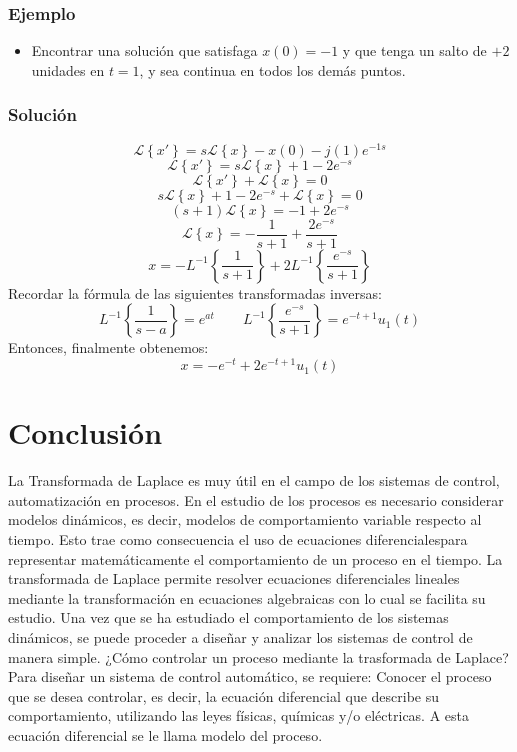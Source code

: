 \documentclass[12pt,a4paper,twoside,onecolumn,openany]{book}
\begin{document}
\subsection{Ejemplo}
\begin{itemize}
\item Encontrar una solución que satisfaga $x(0)=-1$ y que tenga un salto de $+2$ unidades en $t=1$, y sea continua en todos los demás puntos.
\end{itemize}
\subsection{Solución}
\[
\mathcal { L } \left\lbrace {{x'}}\right\rbrace= s \mathcal { L } \left\lbrace {{x}}\right\rbrace-x(0)-j(1)e^{-1s}
\]
\[
\mathcal { L } \left\lbrace {{x'}}\right\rbrace= s \mathcal { L } \left\lbrace {{x}}\right\rbrace+1-2e^{-s}
\]
\[
\mathcal { L } \left\lbrace {{x'}}\right\rbrace + \mathcal { L } \left\lbrace {{x}}\right\rbrace = 0
\]
\[
s\mathcal { L } \left\lbrace {{x}}\right\rbrace + 1 - 2e^{-s} +\mathcal { L } \left\lbrace {{x}}\right\rbrace = 0
\]
\[
(s+1)\mathcal { L } \left\lbrace {{x}}\right\rbrace=-1+2e^{-s}
\]
\[
\mathcal { L } \left\lbrace {{x}}\right\rbrace= -\frac{1}{s+1} + \frac{2e^{-s}}{s+1}
\]
\[
x= -L ^{-1} \left\lbrace {{\frac{1}{s+1}}}\right\rbrace + 2 L ^{-1} \left\lbrace {{\frac{e^{-s}}{s+1}}}\right\rbrace
\]
Recordar la fórmula de las siguientes transformadas inversas:
\[
L^{-1}  \left\lbrace {{\frac{1}{s-a}}}\right\rbrace= e^{at}  \qquad L ^{-1} \left\lbrace {{\frac{e^{-s}}{s+1}}}\right\rbrace= e^{-t+1} u_{1}(t)
\] 
Entonces, finalmente obtenemos:
\[
x=-e^{-t}+2e^{-t+1}u_{1}(t)
\]
\chapter{Conclusión}
La Transformada de Laplace es muy útil en el campo de los sistemas de control, automatización en procesos. En el estudio de los procesos es necesario considerar modelos dinámicos, es decir, modelos de comportamiento variable respecto al tiempo. Esto trae como consecuencia el uso de ecuaciones diferencialespara representar matemáticamente el comportamiento de un proceso en el tiempo.
La transformada de Laplace permite resolver ecuaciones diferenciales lineales mediante la transformación en ecuaciones algebraicas con lo cual se facilita su estudio.
Una vez que se ha estudiado el comportamiento de los sistemas dinámicos, se puede proceder a diseñar y analizar los sistemas de control de manera simple.
¿Cómo controlar un proceso mediante la trasformada de Laplace? Para diseñar un sistema de control automático, se requiere: Conocer el proceso que se desea controlar, es decir, la ecuación diferencial que describe su comportamiento, utilizando las leyes físicas, químicas y/o eléctricas. A esta ecuación diferencial se le llama modelo del proceso.
\end{document}
